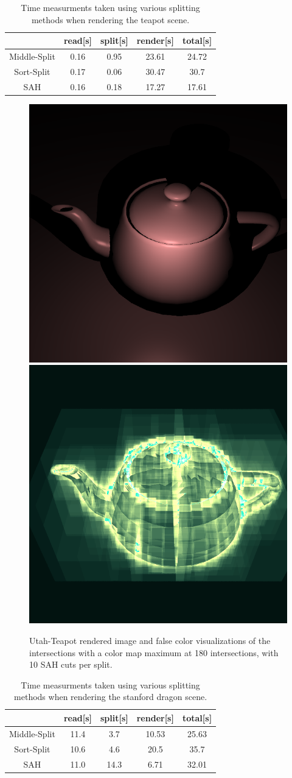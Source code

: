 \begin{table}
\centering
\begin{tabular}{|c|c|c|c|c|} \hline
				& read[s] & split[s] & render[s] & total[s] \\ \hline
Middle-Split    & 0.16 & 0.95  & 23.61  & 24.72	\\
Sort-Split      & 0.17 & 0.06  & 30.47  & 30.7	\\
SAH             & 0.16 & 0.18  & 17.27  & 17.61	\\ \hline
\end{tabular}
\caption{Time measurments taken using various splitting methods when rendering the teapot scene.}
\label{tab:teapodTiming}
\end{table}

\begin{figure}
\centering
\includegraphics[width=0.45\linewidth]{./img/teapot}
\includegraphics[width=0.45\linewidth]{./img/teaFCGreen10}
\caption{Utah-Teapot rendered image and false color visualizations of the intersections with a color map maximum at 180 intersections, with 10 SAH cuts per split.}
\label{fig:teapotWithAcc}
\end{figure}

\begin{table}
\centering
\begin{tabular}{|c|c|c|c|c|} \hline
				& read[s] & split[s] & render[s] & total[s] \\ \hline
Middle-Split    & 11.4 & 3.7   &  10.53  & 25.63 \\
Sort-Split      & 10.6 & 4.6   &  20.5  & 35.7	 \\
SAH             & 11.0 & 14.3  &  6.71  & 32.01	 \\ \hline
\end{tabular}
\caption{Time measurments taken using various splitting methods when rendering the stanford dragon scene.}
\label{tab:DragonTiming}
\end{table}


